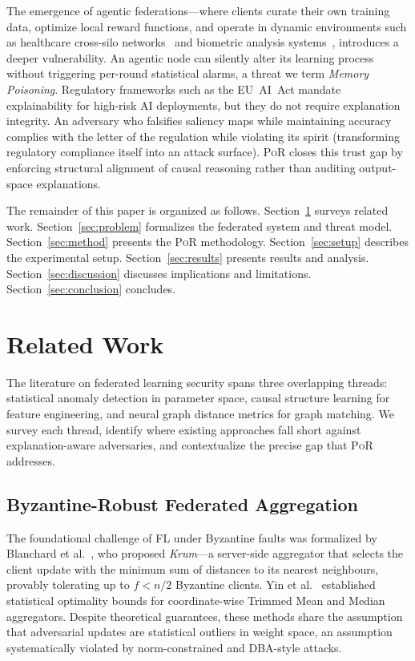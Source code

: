 \documentclass[journal]{IEEEtran}
\newcommand{\por}{\textsc{PoR}}
\begin{document}
The emergence of agentic federations---where clients curate their own
training data, optimize local reward functions, and operate in dynamic
environments such as healthcare cross-silo networks~\cite{ogier2022flamby}
and biometric analysis systems~\cite{liu2015celeba}, introduces a deeper
vulnerability. An agentic node can silently alter its learning process
without triggering per-round statistical alarms, a threat we term
\textit{Memory Poisoning}. Regulatory frameworks such as the EU~AI~Act
mandate explainability for high-risk AI deployments, but they do not require
explanation integrity. An adversary who falsifies saliency maps while
maintaining accuracy complies with the letter of the regulation while
violating its spirit (transforming regulatory compliance itself into an
attack surface). \por{} closes this trust gap by enforcing structural
alignment of causal reasoning rather than auditing output-space explanations.

The remainder of this paper is organized as follows.
Section~\ref{sec:related} surveys related work.
Section~\ref{sec:problem} formalizes the federated system and threat model.
Section~\ref{sec:method} presents the \por{} methodology.
Section~\ref{sec:setup} describes the experimental setup.
Section~\ref{sec:results} presents results and analysis.
Section~\ref{sec:discussion} discusses implications and limitations.
Section~\ref{sec:conclusion} concludes.

\section{Related Work}
\label{sec:related}

The literature on federated learning security spans three overlapping
threads: statistical anomaly detection in parameter space, causal structure
learning for feature engineering, and neural graph distance metrics for
graph matching. We survey each thread, identify where existing approaches
fall short against explanation-aware adversaries, and contextualize the
precise gap that \por{} addresses.

\subsection{Byzantine-Robust Federated Aggregation}

The foundational challenge of FL under Byzantine faults was formalized by
Blanchard et al.~\cite{blanchard2017krum}, who proposed \textit{Krum}---a
server-side aggregator that selects the client update with the minimum sum of
distances to its nearest neighbours, provably tolerating up to $f < n/2$
Byzantine clients. Yin et al.~\cite{yin2018byzantinerobust} established
statistical optimality bounds for coordinate-wise Trimmed Mean and Median
aggregators. Despite theoretical guarantees, these methods share the
assumption that adversarial updates are statistical outliers in weight
space, an assumption systematically violated by norm-constrained and
DBA-style attacks.
\end{document}
